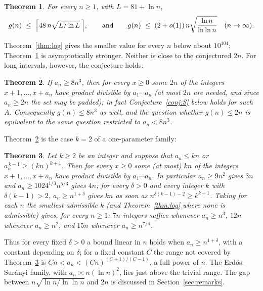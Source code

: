 \documentclass[11pt]{article}
\newtheorem{theorem}{Theorem}[section]
\theoremstyle{definition}
\begin{document}
\begin{theorem}\label{thm:sqrt}
For every $n\ge 1$, with $L=81+\ln n$,
\[
 g(n)\;\le\;\Bigl\lceil 48\,n\sqrt{L/\ln L}\,\Bigr\rceil ,
\qquad\text{and}\qquad
 g(n)\;\le\;(2+o(1))\,n\sqrt{\frac{\ln n}{\ln\ln n}}\quad(n\to\infty).
\]
\end{theorem}

Theorem~\ref{thm:log} gives the smaller value for every $n$ below about $10^{104}$; Theorem~\ref{thm:sqrt}
is asymptotically stronger. Neither is close to the conjectured $2n$. For long intervals, however, the
conjecture holds:

\begin{theorem}\label{thm:long}
If $a_n\ge 8n^3$, then for every $x\ge 0$ some $2n$ of the integers $x+1,\dots,x+a_n$ have product divisible
by $a_1\cdots a_n$ (at most $2n$ are needed, and since $a_n\ge 2n$ the set may be padded); in fact
Conjecture~\ref{conj:S} below holds for such $A$. Consequently $g(n)\le 8n^3$ as
well, and the question whether $g(n)\le 2n$ is equivalent to the same question restricted to $a_n<8n^3$.
\end{theorem}

Theorem~\ref{thm:long} is the case $k=2$ of a one-parameter family:

\begin{theorem}\label{thm:ksplit}
Let $k\ge 2$ be an integer and suppose that $a_n\le kn$ or $a_n^{\,k-1}\ge(kn)^{k+1}$. Then for every $x\ge 0$ some (at
most) $kn$ of the integers $x+1,\dots,x+a_n$ have product divisible by $a_1\cdots a_n$. In particular $a_n\ge 9n^2$
gives $3n$ and $a_n\ge 1024^{1/3}n^{5/3}$ gives $4n$; for every $\delta>0$ and every integer $k$ with
$\delta(k-1)>2$, $a_n\ge n^{1+\delta}$ gives $kn$ as soon as $n^{\delta(k-1)-2}\ge k^{k+1}$. Taking for each $n$ the
smallest admissible $k$ (and Theorem~\ref{thm:log} where none is admissible) gives, for every $n\ge 1$: $7n$ integers
suffice whenever $a_n\ge n^3$, $12n$ whenever $a_n\ge n^2$, and $15n$ whenever $a_n\ge n^{7/4}$.
\end{theorem}

Thus for every fixed $\delta>0$ a bound linear in $n$ holds when $a_n\ge n^{1+\delta}$, with a constant depending on
$\delta$; for a fixed constant $C$ the range not covered by Theorem~\ref{thm:ksplit} is $Cn<a_n<(Cn)^{(C+1)/(C-1)}$,
a full power of $n$. The Erd\H{o}s--Sur\'anyi family, with $a_n\asymp n(\ln n)^2$, lies just above the trivial range.
The gap between $n\sqrt{\ln n/\ln\ln n}$ and $2n$ is discussed in Section~\ref{sec:remarks}.
\end{document}
